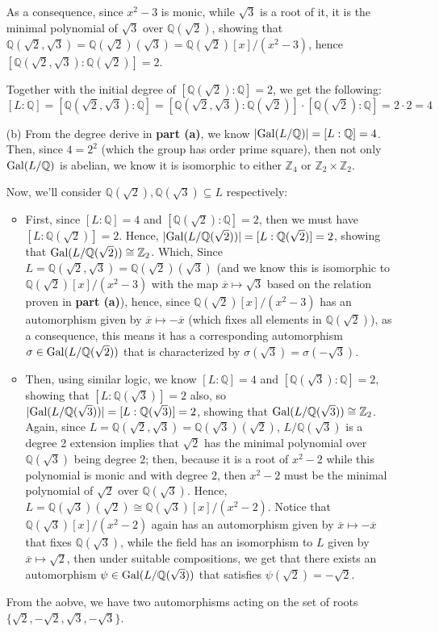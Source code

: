 \documentclass{article}
\newcommand{\ZZ}{\mathbb{Z}}
\newcommand{\QQ}{\mathbb{Q}}
\newcommand{\Gal}{\textmd{Gal}}
\begin{document}
\begin{itemize}
    As a consequence, since $x^2-3$ is monic, while $\sqrt{3}$ is a root of it, it is the minimal polynomial of $\sqrt{3}$ over $\QQ(\sqrt{2})$, showing that $\QQ(\sqrt{2},\sqrt{3}) = \QQ(\sqrt{2})(\sqrt{3}) = \QQ(\sqrt{2})[x]/(x^2-3)$, hence $[\QQ(\sqrt{2},\sqrt{3}):\QQ(\sqrt{2})] = 2$.

    Together with the initial degree of $[\QQ(\sqrt{2}):\QQ]=2$, we get the following:
    \begin{equation}
        \label{eq:6}
        [L:\QQ]=[\QQ(\sqrt{2},\sqrt{3}):\QQ]=[\QQ(\sqrt{2},\sqrt{3}):\QQ(\sqrt{2})]\cdot [\QQ(\sqrt{2}):\QQ] = 2\cdot 2=4
    \end{equation}
    \item[(b)] From the degree derive in \textbf{part (a)}, we know $|\Gal(L/\QQ)| = [L:\QQ] = 4$. Then, since $4=2^2$ (which the group has order prime square), then not only $\Gal(L/\QQ)$ is abelian, we know it is isomorphic to either $\ZZ_4$ or $\ZZ_2\times \ZZ_2$.
    
    Now, we'll consider $\QQ(\sqrt{2}),\QQ(\sqrt{3})\subseteq L$ respectively: 
    \begin{itemize}
        \item First, since $[L:\QQ]=4$ and $[\QQ(\sqrt{2}):\QQ]=2$, then we must have $[L:\QQ(\sqrt{2})] = 2$. Hence, $|\Gal(L/\QQ(\sqrt{2}))| = [L:\QQ(\sqrt{2})] = 2$, showing that $\Gal(L/\QQ(\sqrt{2}))\cong \ZZ_2$. Which, 
        Since $L=\QQ(\sqrt{2},\sqrt{3})=\QQ(\sqrt{2})(\sqrt{3})$ (and we know this is isomorphic to $\QQ(\sqrt{2})[x]/(x^2-3)$ with the map $\overline{x}\mapsto \sqrt{3}$ based on the relation proven in \textbf{part (a)}), hence, since $\QQ(\sqrt{2})[x]/(x^2-3)$ has an automorphism given by $\overline{x}\mapsto -\overline{x}$ (which fixes all elements in $\QQ(\sqrt{2})$), as a consequence, this means it has a corresponding automorphism $\sigma\in \Gal(L/\QQ(\sqrt{2}))$ that is characterized by $\sigma(\sqrt{3}) = \sigma(-\sqrt{3})$.
        \item 
        Then, using similar logic, we know $[L:\QQ]=4$ and $[\QQ(\sqrt{3}):\QQ]=2$, showing that $[L:\QQ(\sqrt{3})]=2$ also, so $|\Gal(L/\QQ(\sqrt{3}))|=[L:\QQ(\sqrt{3})] = 2$, showing that $\Gal(L/\QQ(\sqrt{3}))\cong \ZZ_2$.
        Again, since $L=\QQ(\sqrt{2},\sqrt{3}) = \QQ(\sqrt{3})(\sqrt{2})$, $L/\QQ(\sqrt{3})$ is a degree 2 extension implies that $\sqrt{2}$ has the minimal polynomial over $\QQ(\sqrt{3})$ being degree $2$; then, because it is a root of $x^2-2$ while this polynomial is monic and with degree $2$, then $x^2-2$ must be the minimal polynomial of $\sqrt{2}$ over $\QQ(\sqrt{3})$. Hence, $L=\QQ(\sqrt{3})(\sqrt{2})\cong \QQ(\sqrt{3})[x]/(x^2-2)$. Notice that $\QQ(\sqrt{3})[x]/(x^2-2)$ again has an automorphism given by $\overline{x}\mapsto -\overline{x}$ that fixes $\QQ(\sqrt{3})$, while the field has an isomorphism to $L$ given by $\overline{x}\mapsto \sqrt{2}$, then under suitable compositions, we get that there exists an automorphism $\psi\in \Gal(L/\QQ(\sqrt{3}))$ that satisfies $\psi(\sqrt{2})=-\sqrt{2}$.
    \end{itemize}
    From the aobve, we have two automorphisms acting on the set of roots $\{\sqrt{2},-\sqrt{2},\sqrt{3},-\sqrt{3}\}$. 
    

\end{itemize}
\end{document}
